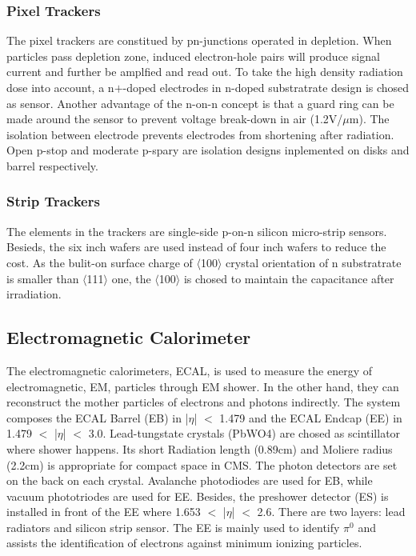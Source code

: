 \subsubsection{Pixel Trackers}
The pixel trackers are constitued by pn-junctions operated in depletion. 
When particles pass depletion zone, induced electron-hole pairs will produce signal current and further be amplfied and read out. 
To take the high density radiation dose into account, a n$+$-doped electrodes in n-doped substratrate design is chosed as sensor. 
Another advantage of the n-on-n concept is that a guard ring can be made around the sensor to prevent voltage break-down in air (1.2V/$\mu $m). 
The isolation between electrode prevents electrodes from shortening after radiation. Open p-stop and moderate p-spary are isolation designs inplemented on disks and barrel respectively\citep{PixelD}.

\subsubsection{Strip Trackers}
The elements in the trackers are single-side p-on-n silicon micro-strip sensors. 
Besieds, the six inch wafers are used instead of four inch wafers to reduce the cost. 
As the bulit-on surface charge of $\langle$100$\rangle$ crystal orientation of n substratrate is smaller than $\langle$111$\rangle$ one, 
the $\langle$100$\rangle$ is chosed to maintain the capacitance after irradiation.

\subsection{Electromagnetic Calorimeter} 
The electromagnetic calorimeters, ECAL, is used to measure the energy of electromagnetic, EM, particles through EM shower. 
In the other hand, they can reconstruct the mother particles of electrons and photons indirectly.
The system composes the ECAL Barrel (EB) in |$\eta $| $<$ 1.479 and the ECAL Endcap (EE) in 1.479 $<$ |$\eta $| $<$ 3.0. 
Lead-tungstate crystals (PbWO4) are chosed as scintillator where shower happens.
Its short Radiation length (0.89cm) and Moliere radius (2.2cm) is appropriate for compact space in CMS.
The photon detectors are set on the back on each crystal. 
Avalanche photodiodes are used for EB, while vacuum phototriodes are used for EE. 
Besides, the preshower detector (ES) is installed in front of the EE where 1.653 $<$ |$\eta $| $<$ 2.6. 
There are two layers: lead radiators and silicon strip sensor.
The EE is mainly used to identify $\pi ^0$ and assists the identification of electrons against minimum ionizing particles.
 

